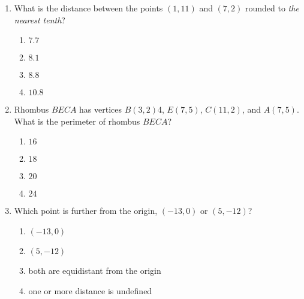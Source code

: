 \begin{enumerate}
\item What is the distance between the points $(1,11)$ and $(7,2)$ rounded to \emph{the nearest tenth}?
  \begin{multicols}{2}
    \begin{enumerate}
      \item $7.7$
      \item $8.1$ 
      \item $8.8$
      \item $10.8$
    \end{enumerate}
  \end{multicols} \vspace{1cm}

\item Rhombus $BECA$ has vertices $B(3,2)$4, $E(7,5)$, $C(11,2)$, and $A(7,5)$. What is the perimeter of rhombus $BECA$?
  \begin{multicols}{2}
    \begin{enumerate}
      \item $16$
      \item $18$ 
      \item $20$
      \item $24$
    \end{enumerate}
  \end{multicols}

\item Which point is further from the origin, $(-13,0)$ or $(5,-12)$?
  \begin{multicols}{2}
    \begin{enumerate}
      \item $(-13,0)$
      \item $(5,-12)$ 
      \item both are equidistant from the origin
      \item one or more distance is undefined
    \end{enumerate}
  \end{multicols}


\end{enumerate}
